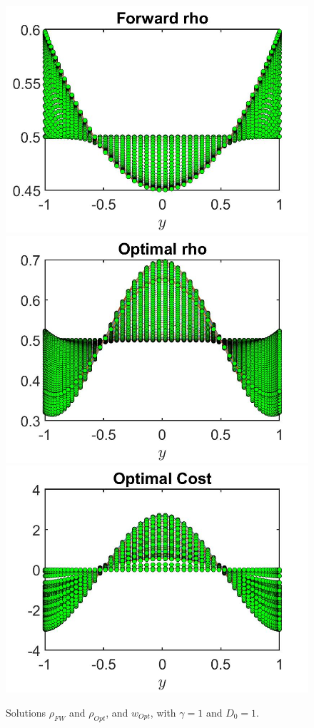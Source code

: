 \documentclass[11pt, a4paper]{article}
\theoremstyle{definition}
\begin{document}
\begin{figure}[h]
	\includegraphics[scale=0.3]{NFrhoFW2.jpg}	
	\includegraphics[scale=0.3]{NFrhoOpt2.jpg}
	\includegraphics[scale=0.3]{NFwOpt2.jpg}
	\caption{Solutions $\rho_{FW}$ and $\rho_{Opt}$,  and $w_{Opt}$, with $\gamma = 1$ and $D_0 = 1$.}
	\label{rhoNF2}
\end{figure}
\end{document}
